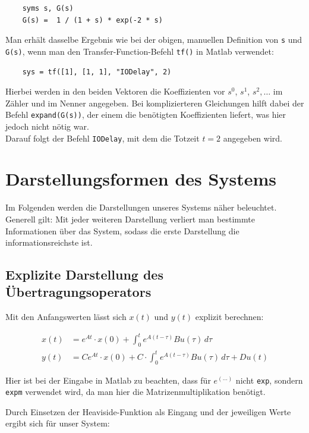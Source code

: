 \begin{verbatim}
    syms s, G(s)
    G(s) =  1 / (1 + s) * exp(-2 * s)
\end{verbatim}

Man erhält dasselbe Ergebnis wie bei der obigen, manuellen Definition von \texttt{s} und \texttt{G(s)}, wenn man den Transfer-Function-Befehl \texttt{tf()} in Matlab verwendet:

\begin{verbatim}
    sys = tf([1], [1, 1], "IODelay", 2)
\end{verbatim}

Hierbei werden in den beiden Vektoren die Koeffizienten vor $s^0$, $s^1$, $s^2, \ldots$ im Zähler und im Nenner angegeben. Bei komplizierteren Gleichungen hilft dabei der Befehl \texttt{expand(G(s))}, der einem die benötigten Koeffizienten liefert, was hier jedoch nicht nötig war. \\
Darauf folgt der Befehl \texttt{\textquotedbl IODelay\textquotedbl}, mit dem die Totzeit $t = 2$ angegeben wird.

\section{Darstellungsformen des Systems}
Im Folgenden werden die Darstellungen unseres Systems näher beleuchtet. \\
Generell gilt: Mit jeder weiteren Darstellung verliert man bestimmte Informationen über das System, sodass die erste Darstellung die informationsreichste ist.

\subsection{Explizite Darstellung des Übertragungsoperators}

Mit den Anfangswerten lässt sich $x(t)$ und $y(t)$ explizit berechnen:

\begin{align*}
    x(t) & = e^{At} \cdot x(0) + \int_{0}^{t} e^{A(t-\tau)}Bu(\tau) \,d\tau \nonumber \\
    y(t) & = Ce^{At} \cdot x(0) + C \cdot \int_{0}^{t} e^{A(t-\tau)}Bu(\tau) \,d\tau + Du(t)
\end{align*}

Hier ist bei der Eingabe in Matlab zu beachten, dass für $e^{(\ldots)}$ nicht \texttt{exp}, sondern \texttt{expm} verwendet wird, da man hier die Matrizenmultiplikation benötigt.

Durch Einsetzen der Heaviside-Funktion als Eingang und der jeweiligen Werte ergibt sich für unser System:

